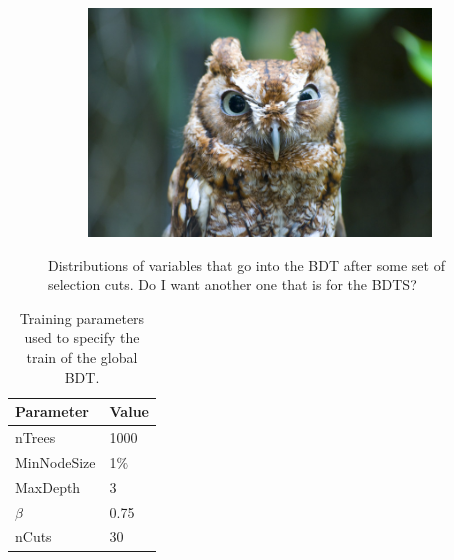 \begin{figure}
    \begin{subfigure}[b]{0.4\textwidth}
        \includegraphics[width=\textwidth]{./Figs/placeholder.jpeg}
        \caption{ }
        \label{fig:}
    \end{subfigure}
    \caption{Distributions of variables that go into the BDT after some set of selection cuts. Do I want another one that is for the BDTS?}
    \label{fig:BDTvars}
\end{figure}


\begin{table}[htbp]
\begin{center}
\begin{tabular}{ll}
\hline
Parameter & Value \\ \hline
nTrees & 1000 \\
MinNodeSize & 1$\%$ \\
MaxDepth & 3 \\
$\beta$ & 0.75 \\
nCuts & 30 \\
\hline
\end{tabular}
\vspace{0.7cm}
\caption{Training parameters used to specify the train of the global BDT.}
\label{tab:BDTtrainingparams}
\end{center}
\end{table}



